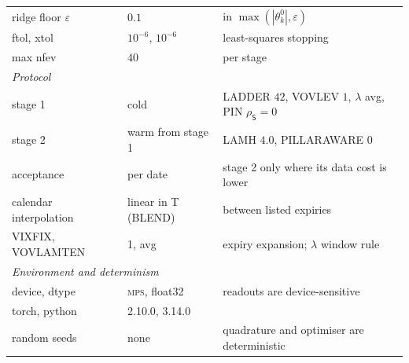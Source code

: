 \begin{tabular}{lll}
\quad ridge floor $\varepsilon$ & $0.1$ & in $\max(|\theta^0_k|,\varepsilon)$ \\
\quad ftol, xtol & $10^{-6}$, $10^{-6}$ & least-squares stopping \\
\quad max nfev & $40$ & per stage \\
\midrule
\multicolumn{3}{l}{\emph{Protocol}} \\
\quad stage 1 & cold & LADDER $42$, VOVLEV $1$, $\lambda$ avg, PIN $\rho_{\mathsf S}{=}0$ \\
\quad stage 2 & warm from stage 1 & LAMH $4.0$, PILLARAWARE $0$ \\
\quad acceptance & per date & stage 2 only where its data cost is lower \\
\quad calendar interpolation & linear in T (BLEND) & between listed expiries \\
\quad VIXFIX, VOVLAMTEN & 1, avg & expiry expansion; $\lambda$ window rule \\
\midrule
\multicolumn{3}{l}{\emph{Environment and determinism}} \\
\quad device, dtype & \textsc{mps}, float32 & readouts are device-sensitive \\
\quad torch, python & 2.10.0, 3.14.0 & \\
\quad random seeds & none & quadrature and optimiser are deterministic \\
\bottomrule
\end{tabular}
